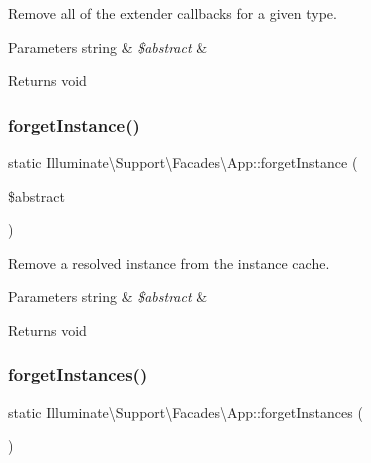 Remove all of the extender callbacks for a given type.


\begin{DoxyParams}[1]{Parameters}
string & {\em \$abstract} & \\
\hline
\end{DoxyParams}
\begin{DoxyReturn}{Returns}
void 
\end{DoxyReturn}
\mbox{\label{class_illuminate_1_1_support_1_1_facades_1_1_app_a247958d883cadf721387a38630e09206}} 
\subsubsection{\texorpdfstring{forget\+Instance()}{forgetInstance()}}
{\footnotesize\ttfamily static Illuminate\textbackslash{}\+Support\textbackslash{}\+Facades\textbackslash{}\+App\+::forget\+Instance (\begin{DoxyParamCaption}\item[{}]{\$abstract }\end{DoxyParamCaption})\hspace{0.3cm}{\ttfamily [static]}}

Remove a resolved instance from the instance cache.


\begin{DoxyParams}[1]{Parameters}
string & {\em \$abstract} & \\
\hline
\end{DoxyParams}
\begin{DoxyReturn}{Returns}
void 
\end{DoxyReturn}
\mbox{\label{class_illuminate_1_1_support_1_1_facades_1_1_app_ae2ba5f8713c76ac249c9c1284e656dca}} 
\subsubsection{\texorpdfstring{forget\+Instances()}{forgetInstances()}}
{\footnotesize\ttfamily static Illuminate\textbackslash{}\+Support\textbackslash{}\+Facades\textbackslash{}\+App\+::forget\+Instances (\begin{DoxyParamCaption}{ }\end{DoxyParamCaption})\hspace{0.3cm}{\ttfamily [static]}}

